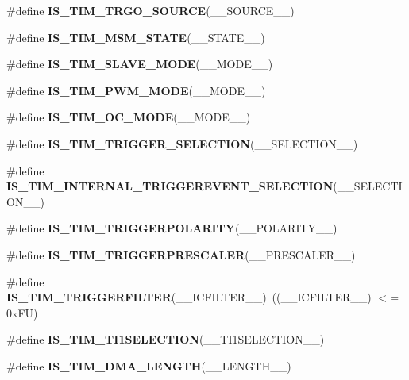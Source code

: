 \begin{DoxyCompactItemize}
\item 
\#define {\bfseries I\+S\+\_\+\+T\+I\+M\+\_\+\+T\+R\+G\+O\+\_\+\+S\+O\+U\+R\+CE}(\+\_\+\+\_\+\+S\+O\+U\+R\+C\+E\+\_\+\+\_\+)
\item 
\#define {\bfseries I\+S\+\_\+\+T\+I\+M\+\_\+\+M\+S\+M\+\_\+\+S\+T\+A\+TE}(\+\_\+\+\_\+\+S\+T\+A\+T\+E\+\_\+\+\_\+)
\item 
\#define {\bfseries I\+S\+\_\+\+T\+I\+M\+\_\+\+S\+L\+A\+V\+E\+\_\+\+M\+O\+DE}(\+\_\+\+\_\+\+M\+O\+D\+E\+\_\+\+\_\+)
\item 
\#define {\bfseries I\+S\+\_\+\+T\+I\+M\+\_\+\+P\+W\+M\+\_\+\+M\+O\+DE}(\+\_\+\+\_\+\+M\+O\+D\+E\+\_\+\+\_\+)
\item 
\#define {\bfseries I\+S\+\_\+\+T\+I\+M\+\_\+\+O\+C\+\_\+\+M\+O\+DE}(\+\_\+\+\_\+\+M\+O\+D\+E\+\_\+\+\_\+)
\item 
\#define {\bfseries I\+S\+\_\+\+T\+I\+M\+\_\+\+T\+R\+I\+G\+G\+E\+R\+\_\+\+S\+E\+L\+E\+C\+T\+I\+ON}(\+\_\+\+\_\+\+S\+E\+L\+E\+C\+T\+I\+O\+N\+\_\+\+\_\+)
\item 
\#define {\bfseries I\+S\+\_\+\+T\+I\+M\+\_\+\+I\+N\+T\+E\+R\+N\+A\+L\+\_\+\+T\+R\+I\+G\+G\+E\+R\+E\+V\+E\+N\+T\+\_\+\+S\+E\+L\+E\+C\+T\+I\+ON}(\+\_\+\+\_\+\+S\+E\+L\+E\+C\+T\+I\+O\+N\+\_\+\+\_\+)
\item 
\#define {\bfseries I\+S\+\_\+\+T\+I\+M\+\_\+\+T\+R\+I\+G\+G\+E\+R\+P\+O\+L\+A\+R\+I\+TY}(\+\_\+\+\_\+\+P\+O\+L\+A\+R\+I\+T\+Y\+\_\+\+\_\+)
\item 
\#define {\bfseries I\+S\+\_\+\+T\+I\+M\+\_\+\+T\+R\+I\+G\+G\+E\+R\+P\+R\+E\+S\+C\+A\+L\+ER}(\+\_\+\+\_\+\+P\+R\+E\+S\+C\+A\+L\+E\+R\+\_\+\+\_\+)
\item 
\mbox{\label{group___t_i_m___private___macros_gab1d40d533bb6edb9920f682ab8b4f96a}} 
\#define {\bfseries I\+S\+\_\+\+T\+I\+M\+\_\+\+T\+R\+I\+G\+G\+E\+R\+F\+I\+L\+T\+ER}(\+\_\+\+\_\+\+I\+C\+F\+I\+L\+T\+E\+R\+\_\+\+\_\+)~((\+\_\+\+\_\+\+I\+C\+F\+I\+L\+T\+E\+R\+\_\+\+\_\+) $<$= 0x\+F\+U)
\item 
\#define {\bfseries I\+S\+\_\+\+T\+I\+M\+\_\+\+T\+I1\+S\+E\+L\+E\+C\+T\+I\+ON}(\+\_\+\+\_\+\+T\+I1\+S\+E\+L\+E\+C\+T\+I\+O\+N\+\_\+\+\_\+)
\item 
\#define {\bfseries I\+S\+\_\+\+T\+I\+M\+\_\+\+D\+M\+A\+\_\+\+L\+E\+N\+G\+TH}(\+\_\+\+\_\+\+L\+E\+N\+G\+T\+H\+\_\+\+\_\+)
\item 
\mbox{\label{group___t_i_m___private___macros_ga3844dc9afbc0894bf6ba16f1d3cb656c}} 

\end{DoxyCompactItemize}
